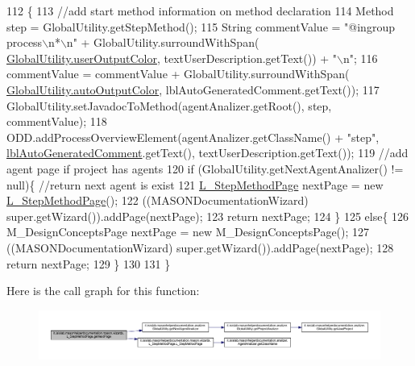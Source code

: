 \begin{DoxyCode}
112                                     \{ 
113         \textcolor{comment}{//add start method information on method declaration}
114         Method step = GlobalUtility.getStepMethod();
115         String commentValue = \textcolor{stringliteral}{"@ingroup process\(\backslash\)n*\(\backslash\)n"} + GlobalUtility.surroundWithSpan(
      \hyperlink{classit_1_1isislab_1_1masonhelperdocumentation_1_1analizer_1_1_global_utility_aec864cd710b27ece609c5a6093211ff4}{GlobalUtility.userOutputColor}, textUserDescription.getText()) + \textcolor{stringliteral}{"\(\backslash\)n"};
116         commentValue = commentValue + GlobalUtility.surroundWithSpan(
      \hyperlink{classit_1_1isislab_1_1masonhelperdocumentation_1_1analizer_1_1_global_utility_a42aa676ad1ff27c42cd4aab651ff2a35}{GlobalUtility.autoOutputColor}, lblAutoGeneratedComment.getText());
117         GlobalUtility.setJavadocToMethod(agentAnalizer.getRoot(), step, commentValue);
118         ODD.addProcessOverviewElement(agentAnalizer.getClassName() + \textcolor{stringliteral}{"step"}, 
      \hyperlink{classit_1_1isislab_1_1masonhelperdocumentation_1_1mason_1_1wizards_1_1_l___step_method_page_af9b2ba2f488b5e92c1e8745127d3162c}{lblAutoGeneratedComment}.getText(), textUserDescription.getText());
119         \textcolor{comment}{//add agent page if project has agents}
120         \textcolor{keywordflow}{if} (GlobalUtility.getNextAgentAnalizer() != null)\{  \textcolor{comment}{//return next agent is exist}
121             \hyperlink{classit_1_1isislab_1_1masonhelperdocumentation_1_1mason_1_1wizards_1_1_l___step_method_page_ae63b8fc92a263e94bef137135e5f47da}{L\_StepMethodPage} nextPage = \textcolor{keyword}{new} \hyperlink{classit_1_1isislab_1_1masonhelperdocumentation_1_1mason_1_1wizards_1_1_l___step_method_page_ae63b8fc92a263e94bef137135e5f47da}{L\_StepMethodPage}();
122             ((MASONDocumentationWizard) super.getWizard()).addPage(nextPage);
123             \textcolor{keywordflow}{return} nextPage;
124         \}
125         \textcolor{keywordflow}{else}\{
126             M\_DesignConceptsPage nextPage = \textcolor{keyword}{new} M\_DesignConceptsPage();
127             ((MASONDocumentationWizard) super.getWizard()).addPage(nextPage);
128             \textcolor{keywordflow}{return} nextPage;
129         \}
130         
131     \}
\end{DoxyCode}


Here is the call graph for this function\-:
\nopagebreak
\begin{figure}[H]
\begin{center}
\leavevmode
\includegraphics[width=350pt]{classit_1_1isislab_1_1masonhelperdocumentation_1_1mason_1_1wizards_1_1_l___step_method_page_a3aa5cb9ab01aceaa78dd1294d9e5f330_cgraph}
\end{center}
\end{figure}


